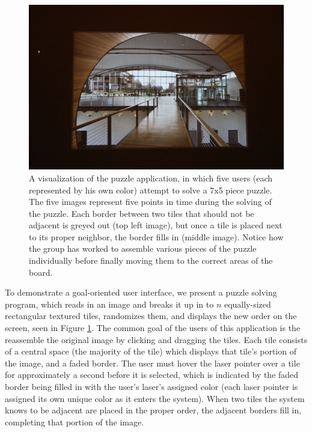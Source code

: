 \documentclass[review]{vgtc}                 %
\begin{document}
\begin{figure}[t]
\begin{center}
\begin{minipage}{0.99\linewidth}
    \includegraphics[width=0.49\linewidth]{images/puzzle5.jpg}
  \end{minipage}  
  \end{center}
  \caption{\label{figure:puzzle} A visualization of the puzzle application, in which five users (each represented 
by his own color) attempt to solve a 7x5 piece puzzle. The five images represent five points in time during the solving 
of the puzzle. Each border between two tiles that should not be adjacent is greyed out (top left image), but once a 
tile is placed next to its proper neighbor, the border fills in (middle image). Notice how the group has worked to 
assemble various pieces of the puzzle individually before finally moving them to the correct areas of the board.}
\end{figure}

To demonstrate a goal-oriented user interface, we present a puzzle
solving program, which reads in an image and breaks it up in to $n$
equally-sized rectangular textured tiles, randomizes them, and
displays the new order on the screen, seen in Figure
\ref{figure:puzzle}. The common goal of the users of this application
is the reassemble the original image by clicking and dragging the
tiles. Each tile consists of a central space (the majority of the
tile) which displays that tile's portion of the image, and a faded
border. The user must hover the laser pointer over a tile for
approximately a second before it is selected, which is indicated by
the faded border being filled in with the user's laser's assigned
color (each laser pointer is assigned its own unique color as it
enters the system). When two tiles the system knows to be adjacent are
placed in the proper order, the adjacent borders fill in, completing
that portion of the image. 
\end{document}
